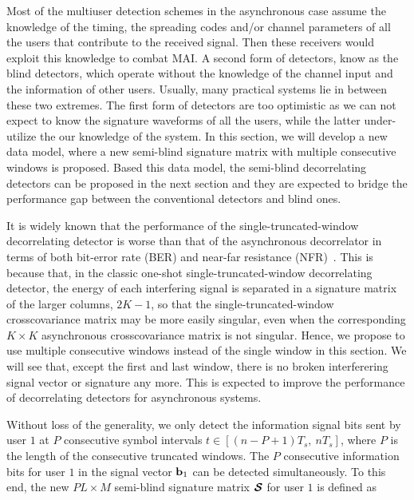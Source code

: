 \documentclass[a4paper,10pt,fleqn, twocolumn]{IEEETran}
\newcommand{\bb}{{\bf b}}
\newcommand{\bcS}{{\mbox {\boldmath ${\cal S}$}}}
\begin{document}
Most of the multiuser detection schemes in the asynchronous case
assume the knowledge of the timing, the spreading codes and/or
channel parameters of all the users that contribute to the
received signal. Then these receivers would exploit this knowledge
to combat MAI. A second form of detectors, know as the blind
detectors, which operate without the knowledge of the channel
input and the information of other users. Usually, many practical
systems lie in between these two extremes. The first form of
detectors are too optimistic as we can not expect to know the
signature waveforms of all the users, while the latter
under-utilize the our knowledge of the system. In this section, we
will develop a new data model, where a new semi-blind signature
matrix with multiple consecutive windows is proposed. Based this
data model, the semi-blind decorrelating detectors can be proposed
in the next section and they are expected to bridge the
performance gap between the conventional detectors and blind ones.

It is widely known that the performance of the
single-truncated-window decorrelating detector is worse than that
of the asynchronous decorrelator in terms of both bit-error rate
(BER) and near-far resistance (NFR)~\cite{Verd98}. This is because
that, in the classic one-shot single-truncated-window
decorrelating detector, the energy of each interfering signal is
separated in a signature matrix of the larger columns, $2K-1$, so
that the single-truncated-window crosscovariance matrix may be
more easily singular, even when the corresponding $K\times K$
asynchronous crosscovariance matrix is not singular. Hence, we
propose to use multiple consecutive windows instead of the single
window in this section. We will see that, except the first and
last window, there is no broken interferering signal vector or
signature any more. This is expected to improve the performance of
decorrelating detectors for asynchronous systems.

Without loss of the generality, we only detect the information
signal bits sent by user $1$ at $P$ consecutive symbol intervals
$t\in [(n-P+1)T_s,\ nT_s]$, where $P$ is the length of the
consecutive truncated windows. The $P$ consecutive information
bits for user $1$ in the signal vector $\bb_1$ can be detected
simultaneously. To this end, the new $PL\times M$ semi-blind
signature matrix $\bcS$ for user $1$ is defined as
\end{document}
